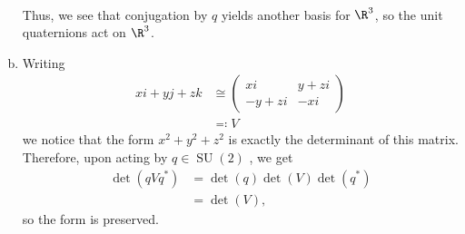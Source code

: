 \documentclass[10pt]{mypackage}
\begin{document}
\begin{solution}
\begin{enumerate}[(a)]
\begin{align*}
      \end{align*}
      Thus, we see that conjugation by $q$ yields another basis for $\R^{3}$, so the unit quaternions act on $\R^{3}$.
    \item Writing
      \begin{align*}
        xi + yj + zk &\cong \begin{pmatrix}xi & y + zi \\ -y + zi & -xi\end{pmatrix}\\
                     &\eqcolon V
      \end{align*}
    we notice that the form $x^2 + y^2 + z^2$ is exactly the determinant of this matrix. Therefore, upon acting by $q\in \operatorname{SU}(2)$ , we get
      \begin{align*}
        \det\left( qVq^{\ast} \right) &= \det\left( q \right)\det\left( V \right)\det\left( q^{\ast} \right)\\
                                      &= \det\left( V \right),
      \end{align*}
      so the form is preserved.
  \end{enumerate}
\end{solution}
\end{document}
